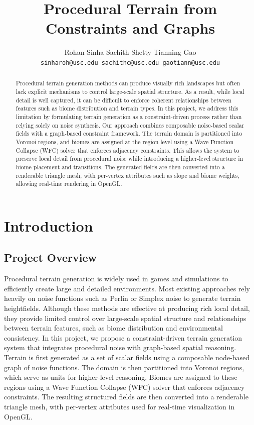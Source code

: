 \documentclass[12pt]{article}
\author{%
    Rohan Sinha  \hspace{2cm}  Sachith Shetty  \hspace{2cm}   Tianning Gao \\
    \texttt{sinharoh@usc.edu \quad sachithc@usc.edu \quad gaotiann@usc.edu}
}
\date{} %
\title{Procedural Terrain from Constraints and Graphs \\[2em]}
\begin{document}
\maketitle

\begin{abstract}
{Procedural terrain generation methods can produce visually rich landscapes but often lack explicit mechanisms to control large-scale spatial structure. As a result, while local detail is well captured, it can be difficult to enforce coherent relationships between features such as biome distribution and terrain types. In this project, we address this limitation by formulating terrain generation as a constraint-driven process rather than relying solely on noise synthesis. Our approach combines composable noise-based scalar fields with a graph-based constraint framework. The terrain domain is partitioned into Voronoi regions, and biomes are assigned at the region level using a Wave Function Collapse (WFC) solver that enforces adjacency constraints. This allows the system to preserve local detail from procedural noise while introducing a higher-level structure in biome placement and transitions. The generated fields are then converted into a renderable triangle mesh, with per-vertex attributes such as slope and biome weights, allowing real-time rendering in OpenGL. }
\end{abstract}


\section{Introduction}

\subsection{Project Overview}
Procedural terrain generation is widely used in games and simulations to efficiently create large and detailed environments. Most existing approaches rely heavily on noise functions such as Perlin or Simplex noise to generate terrain heightfields. Although these methods are effective at producing rich local detail, they provide limited control over large-scale spatial structure and relationships between terrain features, such as biome distribution and environmental consistency.
In this project, we propose a constraint-driven terrain generation system that integrates procedural noise with graph-based spatial reasoning. Terrain is first generated as a set of scalar fields using a composable node-based graph of noise functions. The domain is then partitioned into Voronoi regions, which serve as units for higher-level reasoning. Biomes are assigned to these regions using a Wave Function Collapse (WFC) solver that enforces adjacency constraints. The resulting structured fields are then converted into a renderable triangle mesh, with per-vertex attributes used for real-time visualization in OpenGL.
\end{document}
